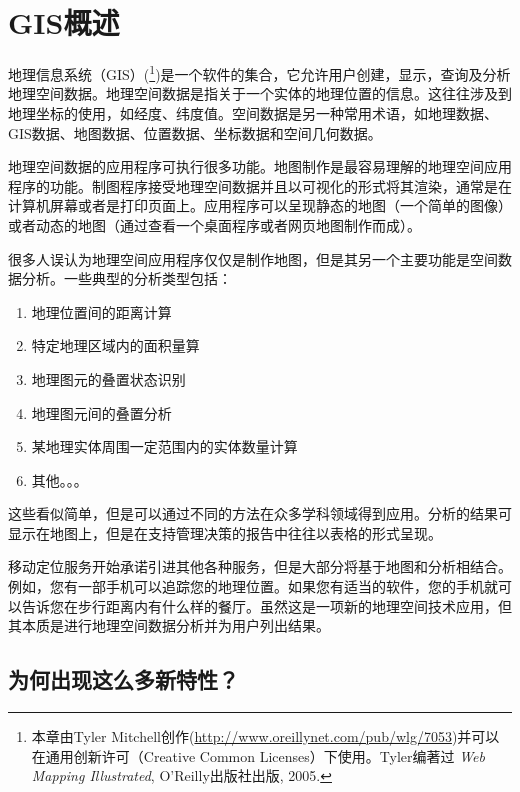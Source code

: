 \pagestyle{scrheadings}
\chapter{GIS概述}\label{label_intro}


地理信息系统（GIS）(\cite{mitchel05}\footnote{本章由Tyler
Mitchell创作(\url{http://www.oreillynet.com/pub/wlg/7053})并可以在通用创新许可（Creative Common Licenses）下使用。Tyler编著过 \textit{Web Mapping Illustrated}, O'Reilly出版社出版, 2005.})是一个软件的集合，它允许用户创建，显示，查询及分析地理空间数据。地理空间数据是指关于一个实体的地理位置的信息。这往往涉及到地理坐标的使用，如经度、纬度值。空间数据是另一种常用术语，如地理数据、GIS数据、地图数据、位置数据、坐标数据和空间几何数据。

地理空间数据的应用程序可执行很多功能。地图制作是最容易理解的地理空间应用程序的功能。制图程序接受地理空间数据并且以可视化的形式将其渲染，通常是在计算机屏幕或者是打印页面上。应用程序可以呈现静态的地图（一个简单的图像）或者动态的地图（通过查看一个桌面程序或者网页地图制作而成）。

很多人误认为地理空间应用程序仅仅是制作地图，但是其另一个主要功能是空间数据分析。一些典型的分析类型包括：

\begin{enumerate}
\item 地理位置间的距离计算
\item 特定地理区域内的面积量算
\item 地理图元的叠置状态识别
\item 地理图元间的叠置分析
\item 某地理实体周围一定范围内的实体数量计算
\item 其他。。。
\end{enumerate}

这些看似简单，但是可以通过不同的方法在众多学科领域得到应用。分析的结果可显示在地图上，但是在支持管理决策的报告中往往以表格的形式呈现。
        
移动定位服务开始承诺引进其他各种服务，但是大部分将基于地图和分析相结合。例如，您有一部手机可以追踪您的地理位置。如果您有适当的软件，您的手机就可以告诉您在步行距离内有什么样的餐厅。虽然这是一项新的地理空间技术应用，但其本质是进行地理空间数据分析并为用户列出结果。

\section{为何出现这么多新特性？}\label{label_whynew}

